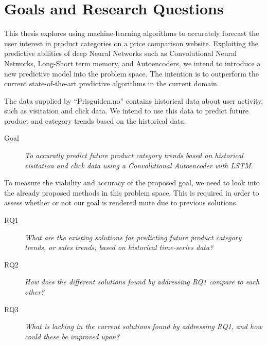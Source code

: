 \section{Goals and Research Questions}
\label{section:Introduction:Goal}


This thesis explores using machine-learning algorithms to accurately forecast the user interest in product categories on a price comparison website.
Exploiting the predictive abilities of deep Neural Networks such as Convolutional Neural Networks, Long-Short term memory, and Autoencoders,
we intend to introduce a new predictive model into the problem space.
The intention is to outperform the current state-of-the-art predictive algorithms in the current domain.

The data supplied by ``Prisguiden.no'' contains historical data about user activity, such as visitation and click data.
We intend to use this data to predict future product and category trends based on the historical data.

\begin{description}
  \item[Goal]{\it To accuratly predict future product category trends based on historical visitation and click data using a Convolutional Autoencoder with LSTM.}
\end{description}

To measure the viability and accuracy of the proposed goal, we need to look into the already proposed methods in this problem space.
This is required in order to assess whether or not our goal is rendered mute due to previous solutions.

\begin{description}
  \item[RQ1]{\it What are the existing solutions for predicting future product category trends, or sales trends, based on historical time-series data?}
\end{description}

\begin{description}
  \item[RQ2]{\it How does the different solutions found by addressing RQ1 compare to each other?}
\end{description}

\begin{description}
  \item[RQ3]{\it What is lacking in the current solutions found by addressing RQ1, and how could these be improved upon?}
\end{description}

